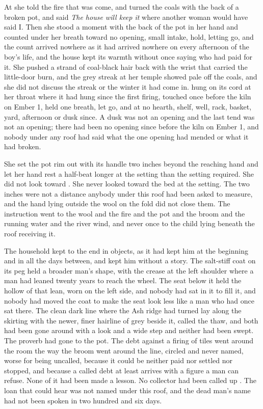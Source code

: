 At  she told the fire that  was come, and turned the coals with the back of a broken pot, and said \emph{The house will keep it} where another woman would have said I. Then she stood a moment with the back of the pot in her hand and counted under her breath toward no opening, small intake, hold, letting go, and the count arrived nowhere as it had arrived nowhere on every afternoon of the boy's life, and the house kept its warmth without once saying who had paid for it. She pushed a strand of coal-black hair back with the wrist that carried the little-door burn, and the grey streak at her temple showed pale off the coals, and she did not discuss the streak or the winter it had come in.  hung on its cord at her throat where it had hung since the first firing, touched once before the kiln on Ember 1, held one breath, let go, and at no hearth, shelf, well, rack, basket, yard, afternoon or dusk since. A dusk was not an opening and the last tend was not an opening; there had been no opening since before the kiln on Ember 1, and nobody under any roof had said what the one opening had mended or what it had broken.

She set the pot rim out with its handle two inches beyond the reaching hand and let her hand rest a half-beat longer at the setting than the setting required. She did not look toward . She never looked toward the bed at the setting. The two inches were not a distance anybody under this roof had been asked to measure, and the hand lying outside the wool on the fold did not close them. The instruction went to the wool and the fire and the pot and the broom and the running water and the river wind, and never once to the child lying beneath the roof receiving it.

\scenebreak

The household kept  to the end in objects, as it had kept him at the beginning and in all the days between, and kept him without a story. The salt-stiff coat on its peg held a broader man's shape, with the crease at the left shoulder where a man had leaned twenty years to reach the wheel. The seat below it held the hollow of that lean, worn on the left side, and nobody had sat in it to fill it, and nobody had moved the coat to make the seat look less like a man who had once sat there. The clean dark line where the Ash ridge had turned lay along the skirting with the newer, finer hairline of grey beside it, called the thaw, and both had been gone around with a look and a wide step and neither had been swept. The proverb had gone to the pot. The debt against a firing of tiles went around the room the way the broom went around the line, circled and never named, worse for being uncalled, because it could be neither paid nor settled nor stopped, and because a called debt at least arrives with a figure a man can refuse. None of it had been made a lesson. No collector had been called up . The loan that could hear was not named under this roof, and the dead man's name had not been spoken in two hundred and six days.

